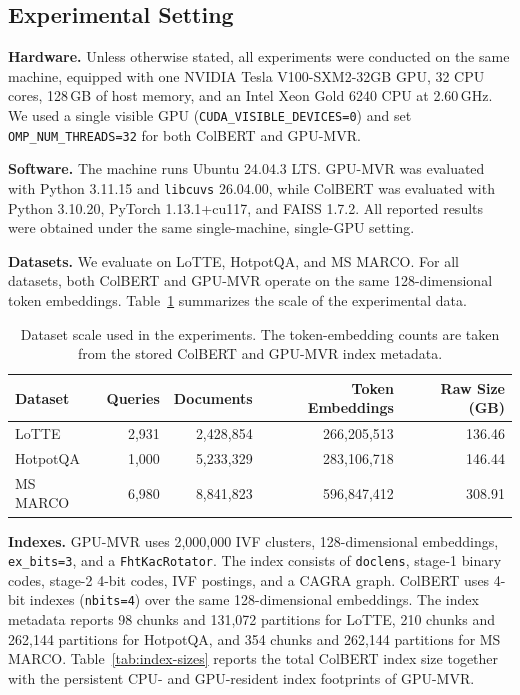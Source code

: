 
\subsection{Experimental Setting}
\textbf{Hardware.} Unless otherwise stated, all experiments were conducted on the same machine, equipped with one NVIDIA Tesla V100-SXM2-32GB GPU, 32 CPU cores, 128\,GB of host memory, and an Intel Xeon Gold 6240 CPU at 2.60\,GHz. We used a single visible GPU (\texttt{CUDA\_VISIBLE\_DEVICES=0}) and set \texttt{OMP\_NUM\_THREADS=32} for both ColBERT and GPU-MVR.

\textbf{Software.} The machine runs Ubuntu 24.04.3 LTS. GPU-MVR was evaluated with Python 3.11.15 and \texttt{libcuvs} 26.04.00, while ColBERT was evaluated with Python 3.10.20, PyTorch 1.13.1+cu117, and FAISS 1.7.2. All reported results were obtained under the same single-machine, single-GPU setting.

\textbf{Datasets.} We evaluate on LoTTE, HotpotQA, and MS MARCO. For all datasets, both ColBERT and GPU-MVR operate on the same 128-dimensional token embeddings. Table~\ref{tab:datasets-and-indexes} summarizes the scale of the experimental data.

\begin{table}[t]
    \centering
    \small
    \begin{tabular}{lrrrr}
        \toprule
        Dataset & Queries & Documents & Token Embeddings & Raw Size (GB) \\
        \midrule
        LoTTE    & 2,931 & 2,428,854 & 266,205,513 & 136.46 \\
        HotpotQA & 1,000 & 5,233,329 & 283,106,718 & 146.44 \\
        MS MARCO & 6,980 & 8,841,823 & 596,847,412 & 308.91 \\
        \bottomrule
    \end{tabular}
    \caption{Dataset scale used in the experiments. The token-embedding counts are taken from the stored ColBERT and GPU-MVR index metadata.}
    \label{tab:datasets-and-indexes}
\end{table}

\textbf{Indexes.} GPU-MVR uses 2,000,000 IVF clusters, 128-dimensional embeddings, \texttt{ex\_bits=3}, and a \texttt{FhtKacRotator}. The index consists of \texttt{doclens}, stage-1 binary codes, stage-2 4-bit codes, IVF postings, and a CAGRA graph. ColBERT uses 4-bit indexes (\texttt{nbits=4}) over the same 128-dimensional embeddings. The index metadata reports 98 chunks and 131,072 partitions for LoTTE, 210 chunks and 262,144 partitions for HotpotQA, and 354 chunks and 262,144 partitions for MS MARCO. Table~\ref{tab:index-sizes} reports the total ColBERT index size together with the persistent CPU- and GPU-resident index footprints of GPU-MVR.

